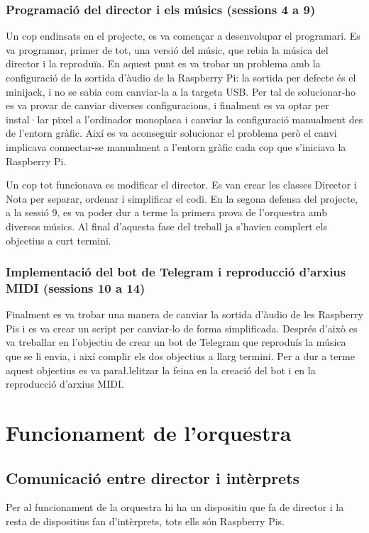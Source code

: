 \documentclass[a4paper]{paper}
\let\oldsection\section
\renewcommand\section{\clearpage\oldsection}
\begin{document}
\subsubsection{Programació del director i els músics (sessions 4 a 9)}
Un cop endinsats en el projecte, es va començar a desenvolupar el programari. Es va programar, primer de tot, una versió del músic, que rebia la música del director i la reproduïa. En aquest punt es va trobar un problema amb la configuració de la sortida d'àudio de la Raspberry Pi: la sortida per defecte és el minijack, i no se sabia com canviar-la a la targeta USB. Per tal de solucionar-ho es va provar de canviar diverses configuracions, i finalment es va optar per instal·lar pixel a l'ordinador monoplaca i canviar la configuració manualment des de l'entorn gràfic. Així es va aconseguir solucionar el problema però el canvi implicava connectar-se manualment a l'entorn gràfic cada cop que s'iniciava la Raspberry Pi.

Un cop tot funcionava es modificar el director. Es van crear les classes Director i Nota per separar, ordenar i simplificar el codi. En la segona defensa del projecte, a la sessió 9, es va poder dur a terme la primera prova de l'orquestra amb diversos músics. Al final d'aquesta fase del treball ja s'havien complert els objectius a curt termini.

\subsubsection{Implementació del bot de Telegram i reproducció d'arxius MIDI (sessions 10 a 14)}
Finalment es va trobar una manera de canviar la sortida d'àudio de les Raspberry Pis i es va crear un script per canviar-lo de forma simplificada. Després d'això es va treballar en l'objectiu de crear un bot de Telegram que reproduís la música que se li envia, i així complir els dos objectius a llarg termini. Per a dur a terme aquest objectius es va para\l.lelitzar la feina en la creació del bot i en la reproducció d'arxius MIDI.

\section{Funcionament de l'orquestra}

\subsection{Comunicació entre director i intèrprets}
Per al funcionament de la orquestra hi ha un dispositiu que fa de director i la resta de dispositius fan d'intèrprets, tots ells són Raspberry Pis.
\end{document}
